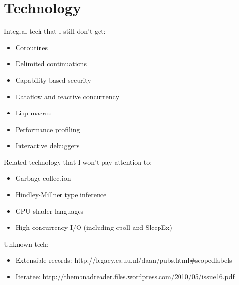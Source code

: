 \chapter{Technology}

Integral tech that I still don't get:

\begin{itemize}
\item Coroutines
\item Delimited continuations
\item Capability-based security
\item Dataflow and reactive concurrency
\item Lisp macros
\item Performance profiling
\item Interactive debuggers
\end{itemize}

Related technology that I won't pay attention to:

\begin{itemize}
\item Garbage collection
\item Hindley-Millner type inference
\item GPU shader languages
\item High concurrency I/O (including epoll and SleepEx)
\end{itemize}

Unknown tech:
\begin{itemize}
\item Extensible records: http://legacy.cs.uu.nl/daan/pubs.html#scopedlabels
\item Iteratee: http://themonadreader.files.wordpress.com/2010/05/issue16.pdf
\end{itemize}
